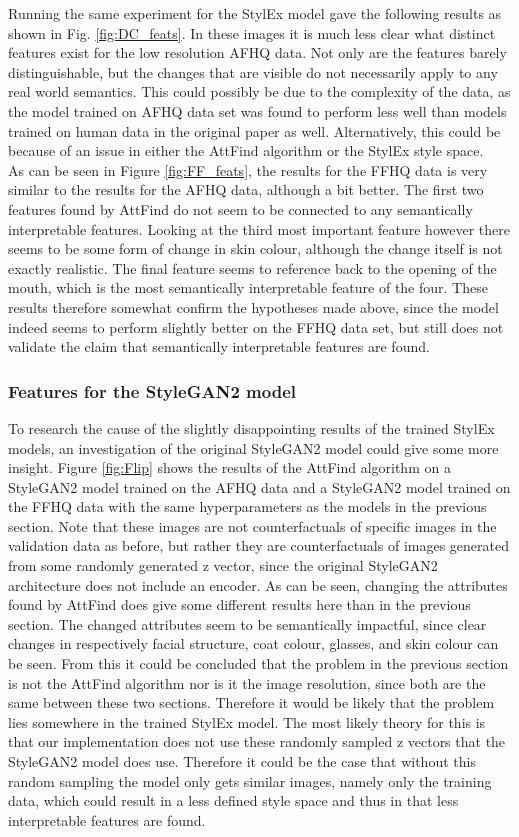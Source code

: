 Running the same experiment for the StylEx model gave the following results as shown in Fig. \ref{fig:DC_feats}. In these images it is much less clear what distinct features exist for the low resolution AFHQ data. Not only are the features barely distinguishable, but the changes that are visible do not necessarily apply to any real world semantics. This could possibly be due to the complexity of the data, as the model trained on AFHQ data set was found to perform less well than models trained on human data in the original paper as well. Alternatively, this could be because of an issue in either the AttFind algorithm or the StylEx style space. \\
As can be seen in Figure \ref{fig:FF_feats}, the results for the FFHQ data is very similar to the results for the AFHQ data, although a bit better. The first two features found by AttFind do not seem to be connected to any semantically interpretable features. Looking at the third most important feature however there seems to be some form of change in skin colour, although the change itself is not exactly realistic. The final feature seems to reference back to the opening of the mouth, which is the most semantically interpretable feature of the four. These results therefore somewhat confirm the hypotheses made above, since the model indeed seems to perform slightly better on the FFHQ data set, but still does not validate the claim that semantically interpretable features are found.

\subsubsection{Features for the StyleGAN2 model}
To research the cause of the slightly disappointing results of the trained StylEx models, an investigation of the original StyleGAN2 model could give some more insight. Figure \ref{fig:Flip} shows the results of the AttFind algorithm on a StyleGAN2 model trained on the AFHQ data and a StyleGAN2 model trained on the FFHQ data with the same hyperparameters as the models in the previous section. Note that these images are not counterfactuals of specific images in the validation data as before, but rather they are counterfactuals of images generated from some randomly generated z vector, since the original StyleGAN2 architecture does not include an encoder. As can be seen, changing the attributes found by AttFind does give some different results here than in the previous section. The changed attributes seem to be semantically impactful, since clear changes in respectively facial structure, coat colour, glasses, and skin colour can be seen. From this it could be concluded that the problem in the previous section is not the AttFind algorithm nor is it the image resolution, since both are the same between these two sections. Therefore it would be likely that the problem lies somewhere in the trained StylEx model. The most likely theory for this is that our implementation does not use these randomly sampled z vectors that the StyleGAN2 model does use. Therefore it could be the case that without this random sampling the model only gets similar images, namely only the training data, which could result in a less defined style space and thus in that less interpretable features are found.

